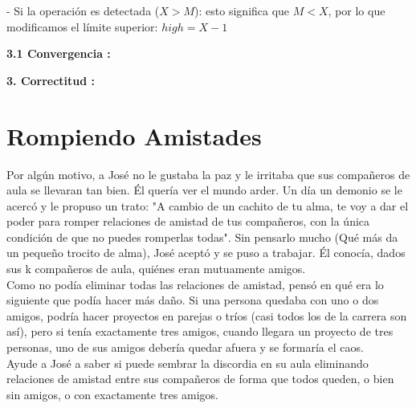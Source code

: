 \documentclass[
10pt, %
a4paper, %
oneside, %
headinclude,footinclude, %
BCOR5mm, %
]{scrartcl}
\begin{document}
- Si la operación es detectada ($X > M$): esto significa que $M < X$, por lo que modificamos el límite superior: $high = X -1$

\textbf{3.1 Convergencia :}

\textbf{3. Correctitud :}

\section{Rompiendo Amistades}

Por algún motivo, a José no le gustaba la paz y le irritaba que sus compañeros de aula se llevaran tan bien. Él quería ver
el mundo arder. Un día un demonio se le acercó y le propuso un trato: "A cambio de un cachito de tu alma, te voy a dar el poder para
romper relaciones de amistad de tus compañeros, con la única condición de que no puedes romperlas todas". Sin pensarlo mucho (Qué más
da un pequeño trocito de alma), José aceptó y se puso a trabajar. Él conocía, dados sus k compañeros de aula, quiénes eran mutuamente
amigos.\\

Como no podía eliminar todas las relaciones de amistad, pensó en qué era lo siguiente que podía hacer más daño. Si una persona quedaba con
uno o dos amigos, podría hacer proyectos en parejas o tríos (casi todos los de la carrera son así), pero si tenía exactamente tres amigos,
cuando llegara un proyecto de tres personas, uno de sus amigos debería quedar afuera y se formaría el caos. \\

Ayude a José a saber si puede sembrar la discordia en su aula eliminando relaciones de amistad entre sus compañeros de forma que todos queden, o bien sin amigos, o con exactamente tres amigos.




\end{document}

